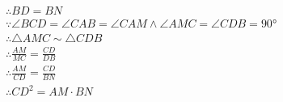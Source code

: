 \begin{questions}
\begin{proofsolution}
\begin{penum}
\begin{align*}
				       & \therefore BD = BN                                                                          \\
				       & \because \angle{BCD} = \angle{CAB} = \angle{CAM} \land \angle{AMC} = \angle{CDB} = \ang{90} \\
				       & \therefore \triangle{AMC} \sim \triangle{CDB}                                               \\
				       & \therefore \frac{AM}{MC} = \frac{CD}{DB}                                                    \\
				       & \therefore \frac{AM}{CD} = \frac{CD}{BN}                                                    \\
				       & \therefore CD^2 = AM\cdot BN
			      \end{align*}
		\end{penum}
	\end{proofsolution}

\end{questions}
